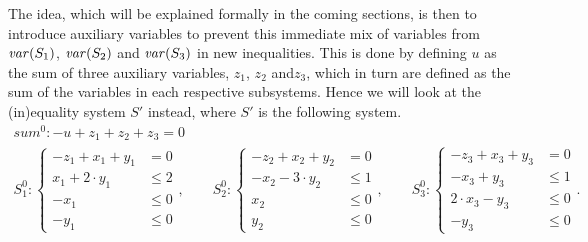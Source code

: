 \begin{example}
The idea, which will be explained formally in the coming sections, is then to introduce auxiliary variables to prevent this immediate mix of variables from $\mathit{var}(S_1)$, $\mathit{var}(S_2)$ and $\mathit{var}(S_3)$ in new inequalities. This is done by defining $u$ as the sum of three auxiliary variables, $z_1$, $z_2$ and$ z_3$, which in turn are defined as the sum of the variables in each respective subsystems. Hence we will look at the (in)equality system $S'$ instead, where $S'$ is the following system.
\begin{gather*}
\mathit{sum}^0: -u + z_1 + z_2 + z_3 = 0\\
S_1^0 : \left\{ \begin{array}{ll}-z_1 + x_1 + y_1 &= 0\\
															  x_1 + 2 \cdot y_1 &\leq 2\\
															 -x_1 &\leq 0\\
															 -y_1 &\leq 0\end{array}\right.,\qquad
S_2^0 : \left\{ \begin{array}{ll} -z_2 + x_2 + y_2 &= 0\\
																-x_2 - 3\cdot y_2 &\leq 1\\
																 x_2 &\leq 0\\
																 y_2 &\leq 0\end{array}\right.,\qquad
S_3^0 : \left\{ \begin{array}{ll} -z_3 + x_3 + y_3 &= 0\\
																 -x_3 + y_3 &\leq 1\\
																 2\cdot x_3 - y_3 &\leq 0\\
																 -y_3 &\leq 0\end{array}\right..

\end{gather*}
\end{example}

